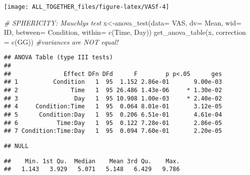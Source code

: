\documentclass[
]{article}
\newenvironment{Shaded}{\begin{snugshade}}{\end{snugshade}}
\newcommand{\AttributeTok}[1]{\textcolor[rgb]{0.77,0.63,0.00}{#1}}
\newcommand{\CommentTok}[1]{\textcolor[rgb]{0.56,0.35,0.01}{\textit{#1}}}
\newcommand{\FunctionTok}[1]{\textcolor[rgb]{0.00,0.00,0.00}{#1}}
\newcommand{\NormalTok}[1]{#1}
\newcommand{\OtherTok}[1]{\textcolor[rgb]{0.56,0.35,0.01}{#1}}
\newcommand{\SpecialCharTok}[1]{\textcolor[rgb]{0.00,0.00,0.00}{#1}}
\newcommand{\StringTok}[1]{\textcolor[rgb]{0.31,0.60,0.02}{#1}}
\begin{document}
\texttt{[image: ALL\_TOGETHER\_files/figure-latex/VASf-4]}

\begin{Shaded}
\begin{Highlighting}[]
\CommentTok{\# SPHERICITY: Mauchly\textquotesingle{}s test}
\NormalTok{x}\OtherTok{\textless{}{-}}\FunctionTok{anova\_test}\NormalTok{(}\AttributeTok{data=}\NormalTok{ VAS, }\AttributeTok{dv=}\NormalTok{ Mean, }\AttributeTok{wid=}\NormalTok{ ID, }\AttributeTok{between=}\NormalTok{ Condition, }\AttributeTok{within=} \FunctionTok{c}\NormalTok{(Time, Day))}
\FunctionTok{get\_anova\_table}\NormalTok{(x, }\AttributeTok{correction =} \FunctionTok{c}\NormalTok{(}\StringTok{\textquotesingle{}GG\textquotesingle{}}\NormalTok{)) }\CommentTok{\#variances are NOT equal! }
\end{Highlighting}
\end{Shaded}

\begin{verbatim}
## ANOVA Table (type III tests)
## 
##               Effect DFn DFd      F        p p<.05      ges
## 1          Condition   1  95  1.152 2.86e-01       9.00e-03
## 2               Time   1  95 26.486 1.43e-06     * 1.30e-02
## 3                Day   1  95 10.908 1.00e-03     * 2.40e-02
## 4     Condition:Time   1  95  0.064 8.01e-01       3.12e-05
## 5      Condition:Day   1  95  0.206 6.51e-01       4.61e-04
## 6           Time:Day   1  95  0.122 7.28e-01       2.86e-05
## 7 Condition:Time:Day   1  95  0.094 7.60e-01       2.20e-05
\end{verbatim}

\begin{Shaded}
\end{Shaded}

\begin{verbatim}
## NULL
\end{verbatim}

\begin{Shaded}
\end{Shaded}

\begin{verbatim}
##    Min. 1st Qu.  Median    Mean 3rd Qu.    Max. 
##   1.143   3.929   5.071   5.148   6.429   9.786
\end{verbatim}
\end{document}
